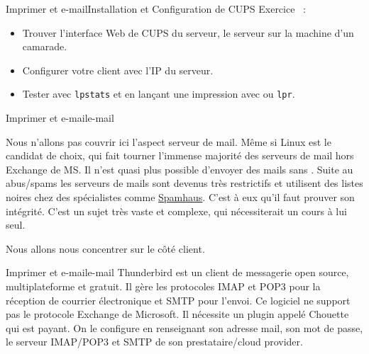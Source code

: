 \documentclass{beamer}
\begin{document}
    \begin{frame}{Imprimer et e-mail}{Installation et Configuration de CUPS}
        Exercice \execcounterdispinc~:
        \begin{itemize}
            \item Trouver l'interface Web de CUPS du serveur, le serveur sur la machine d'un camarade.
            \item Configurer votre client avec l'IP du serveur.
            \item Tester avec \lstinline{lpstats} et en lançant une impression avec ou \lstinline{lpr}.
        \end{itemize}
    \end{frame}

    \begin{frame}{Imprimer et e-mail}{e-mail}
        \begin{dangercolorbox}
            Nous n'allons pas couvrir ici l'aspect serveur de mail. Même si Linux est le candidat de choix, qui fait tourner l'immense majorité des serveurs de mail hors Exchange de MS.
            \bigbreak
            Il n'est quasi plus possible d'envoyer des mails sans .
            Suite au abus/spams les serveurs de mails sont devenus très restrictifs et utilisent des listes noires chez des spécialistes comme \href{https://www.spamhaus.org/}{Spamhaus}.
            C'est à eux qu'il faut prouver son intégrité.
            \bigbreak
            C'est un sujet très vaste et complexe, qui nécessiterait un cours à lui seul.
        \end{dangercolorbox}
        Nous allons nous concentrer sur le côté client.
    \end{frame}

    \begin{frame}{Imprimer et e-mail}{e-mail}
        Thunderbird est un client de messagerie open source, multiplateforme et gratuit.
        Il gère les protocoles IMAP et POP3 pour la réception de courrier électronique et SMTP pour l'envoi.
        \bigbreak
        Ce logiciel ne support pas le protocole Exchange de Microsoft.
        Il nécessite un plugin appelé Chouette qui est payant.
        \bigbreak
        On le configure en renseignant son adresse mail, son mot de passe, le serveur IMAP/POP3 et SMTP de son prestataire/cloud provider.
    \end{frame}
\end{document}
